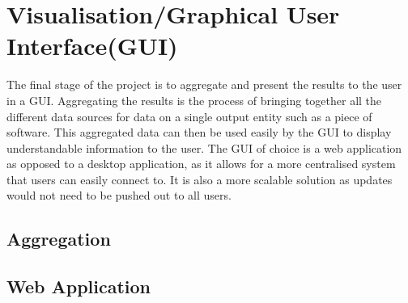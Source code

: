 
\section{Visualisation/Graphical User Interface(GUI)}
The final stage of the project is to aggregate and present the results to the user in a GUI.
Aggregating the results is the process of bringing together all the different data sources for data on a single output entity such as a piece of software. This aggregated data can then be used easily by the GUI to display understandable information to the user.
The GUI of choice is a web application as opposed to a desktop application, as it allows for a more centralised system that users can easily connect to. It is also a more scalable solution as updates would not need to be pushed out to all users.

\subsection{Aggregation}

\subsection{Web Application}
